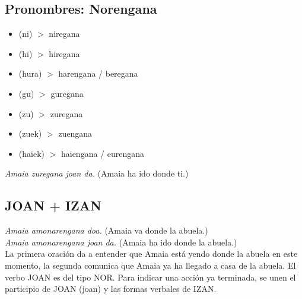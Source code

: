 \documentclass[11pt, a4paper]{article}
\begin{document}
\subsection{Pronombres: Norengana}
\begin{multicols}{2}
\begin{itemize}
\item (ni) $>$ niregana
\item (hi) $>$ hiregana
\item (hura) $>$ harengana / beregana\\
\item (gu) $>$ guregana
\item (zu) $>$ zuregana
\item (zuek) $>$ zuengana
\item (haiek) $>$ haiengana / eurengana
\end{itemize}
\end{multicols}
\indent \textit{Amaia zuregana joan da.} (Amaia ha ido donde ti.)

\subsection{JOAN + IZAN}
\indent \indent \textit{Amaia amonarengana doa.}
(Amaia va donde la abuela.)\\
\indent \textit{Amaia amonarengana joan da.}
(Amaia ha ido donde la abuela.)\\
\noindent La primera oración da a entender que Amaia está yendo donde la abuela en este momento, la segunda comunica que Amaia ya ha llegado a casa de la abuela. El verbo JOAN es del tipo NOR. Para indicar una acción ya terminada, se unen el participio de JOAN (joan) y las formas verbales de IZAN.\\
\end{document}
